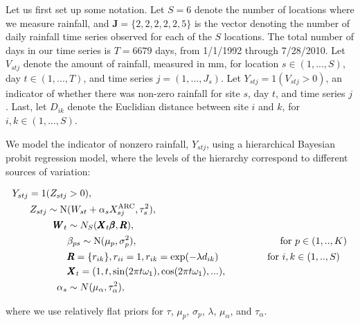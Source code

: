 \documentclass[12pt]{article}
\def\bbeta{\pmb{\beta}}
\def\bX{\pmb{X}}
\def\bJ{\pmb{J}}
\def\bR{\pmb{R}}
\def\bW{\pmb{W}}
\begin{document}
Let us first set up some notation. Let $S=6$ denote the number of locations where we measure rainfall, and $\bJ = \{2,2,2,2,2,5\}$ is the vector denoting the number of daily rainfall time series observed for each of the $S$ locations. The total number of days in our time series is $T=6679$ days, from 1/1/1992 through 7/28/2010. Let $V_{stj}$ denote the amount of rainfall, measured in mm, for location $s \in (1,...,S)$, day $t \in (1,...,T)$, and time series $j = (1,...,J_s)$. Let $Y_{stj} = 1(V_{stj}>0)$, an indicator of whether there was non-zero rainfall for site $s$, day $t$, and time series $j$. Last, let $D_{ik}$ denote the Euclidian distance between site $i$ and $k$, for $i,k \in (1,...,S)$.

We model the indicator of nonzero rainfall, $Y_{stj}$, using a hierarchical Bayesian probit regression model, where the levels of the hierarchy correspond to different sources of variation:

\begin{align}
Y_{stj} = 1(Z_{stj} &> 0),\\
Z_{stj} \sim \text{N}&(W_{st} + \alpha_s X^\text{ARC}_{sj}, \tau_s^2),\\
\bW_t &\sim N_S(\bX_t \bbeta, \bR),\\
&\beta_{ps} \sim \text{N}(\mu_p, \sigma^2_p), \hspace{2.04in} \text{for $p \in (1,..,K)$}\\
&\bR=\{r_{ik}\}, r_{ii}=1, r_{ik} = \exp(-\lambda d_{ik}) \hspace{0.7in} \text{for $i,k \in (1,..,S)$}\\
&\bX_t = (1,t,\sin(2\pi t \omega_1), \cos(2\pi t \omega_1),...),\\
\alpha_s &\sim N(\mu_\alpha, \tau^2_\alpha),
\end{align}

where we use relatively flat priors for $\tau$, $\mu_p$, $\sigma_p$, $\lambda$, $\mu_\alpha$, and $\tau_\alpha$.
\end{document}
